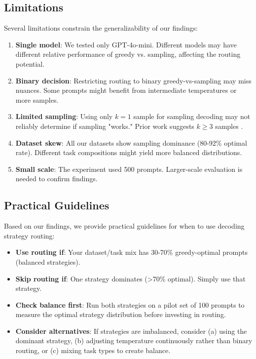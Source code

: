\documentclass[11pt,letterpaper]{article}
\begin{document}
\subsection{Limitations}

Several limitations constrain the generalizability of our findings:

\begin{enumerate}
    \item \textbf{Single model}: We tested only GPT-4o-mini. Different models may have different relative performance of greedy vs. sampling, affecting the routing potential.
    \item \textbf{Binary decision}: Restricting routing to binary greedy-vs-sampling may miss nuances. Some prompts might benefit from intermediate temperatures or more samples.
    \item \textbf{Limited sampling}: Using only $k=1$ sample for sampling decoding may not reliably determine if sampling "works." Prior work suggests $k \geq 3$ samples \cite{Wang2022}.
    \item \textbf{Dataset skew}: All our datasets show sampling dominance (80-92\% optimal rate). Different task compositions might yield more balanced distributions.
    \item \textbf{Small scale}: The experiment used 500 prompts. Larger-scale evaluation is needed to confirm findings.
\end{enumerate}

\subsection{Practical Guidelines}

Based on our findings, we provide practical guidelines for when to use decoding strategy routing:

\begin{itemize}
    \item \textbf{Use routing if}: Your dataset/task mix has 30-70\% greedy-optimal prompts (balanced strategies).
    \item \textbf{Skip routing if}: One strategy dominates (>70\% optimal). Simply use that strategy.
    \item \textbf{Check balance first}: Run both strategies on a pilot set of 100 prompts to measure the optimal strategy distribution before investing in routing.
    \item \textbf{Consider alternatives}: If strategies are imbalanced, consider (a) using the dominant strategy, (b) adjusting temperature continuously rather than binary routing, or (c) mixing task types to create balance.
\end{itemize}
\end{document}
